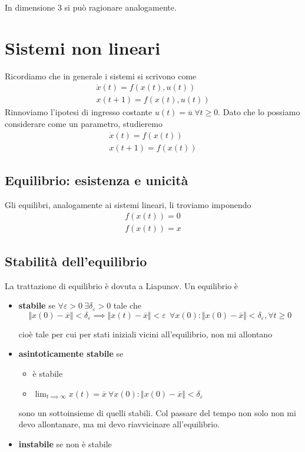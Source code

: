 In dimensione $3$ si può ragionare analogamente.

\chapter{Sistemi non lineari}

Ricordiamo che in generale i sistemi si scrivono come
\begin{gather*}
	\dot{x}(t) =f(x(t) ,u(t))\\
	x(t+1) =f(x(t) ,u(t))
\end{gather*}
Rinnoviamo l'ipotesi di ingresso costante $u(t) =\overline{u} \ \forall t\geq 0$. Dato che lo possiamo considerare come un parametro, studieremo
\begin{gather*}
	\dot{x}(t) =f(x(t))\\
	x(t+1) =f(x(t))
\end{gather*}

\section{Equilibrio: esistenza e unicità}

Gli equilibri, analogamente ai sistemi lineari, li troviamo imponendo
\begin{gather*}
	f(x(t)) =0\\
	f(x(t)) =x
\end{gather*}

\section{Stabilità dell'equilibrio}

La trattazione di equilibrio è dovuta a Liapunov. Un equilibrio è
\begin{itemize}
	\item \textbf{stabile} se $\forall \varepsilon  >0\ \exists \delta _{\varepsilon }  >0$ tale che\begin{equation*}
	      \Vert x(0) -\overline{x}\Vert < \delta _{\varepsilon } \implies \Vert x(t) -\overline{x}\Vert < \varepsilon \ \ \forall x(0) :\Vert x(0) -\overline{x}\Vert < \delta _{\varepsilon } ,\forall t\geq 0
	\end{equation*}
	
	cioè tale per cui per stati iniziali vicini all'equilibrio, non mi allontano
	\item \textbf{asintoticamente stabile} se
	      \begin{itemize}
	      	\item è stabile
	      	\item $\lim _{t\implies \infty } x(t) =\overline{x} \ \forall x(0) :\Vert x(0) -\overline{x}\Vert < \delta _{\varepsilon }$
	      \end{itemize}
	      
	      sono un sottoinsieme di quelli stabili. Col passare del tempo non solo non mi devo allontanare, ma mi devo riavvicinare all'equilibrio.
	\item \textbf{instabile} se non è stabile
\end{itemize}

